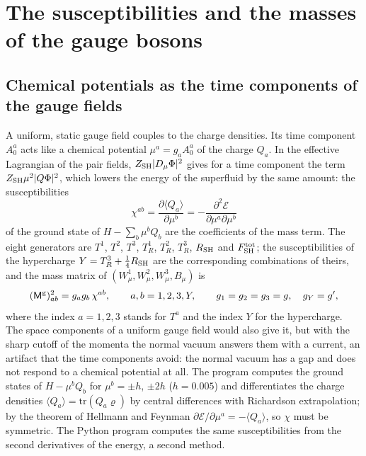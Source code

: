 \documentclass[aps,prd,onecolumn,superscriptaddress,nofootinbib,floatfix,longbibliography]{revtex4-2}
\newcommand{\SH}{{\rm SH}}
\newcommand{\tr}{\mathrm{tr}}
\begin{document}
\section{The susceptibilities and the masses of the gauge bosons}
\label{sec:gauge}

\subsection{Chemical potentials as the time components of the gauge fields}

A uniform, static gauge field couples to the charge densities. Its time component $A^a_0$ acts like a chemical potential
$\mu^a=g_aA^a_0$ of the charge $Q_a$. In the effective Lagrangian of the pair fields, $Z_\SH|D_\mu\Phi|^2$ gives for a
time component the term $Z_\SH\mu^2|Q\Phi|^2$, which lowers the energy of the superfluid by the same amount: the
susceptibilities
\begin{equation}
\chi^{ab}=\frac{\partial\langle Q_a\rangle}{\partial\mu^b}=-\frac{\partial^2\mathcal E}{\partial\mu^a\partial\mu^b}
\label{eq:chi}
\end{equation}
of the ground state of $H-\sum_b\mu^bQ_b$ are the coefficients of the mass term. The eight generators are $T^1$, $T^2$,
$T^3$, $T^1_R$, $T^2_R$, $T^3_R$, $R_\SH$ and $F^{\rm tot}_\SH$; the susceptibilities of the hypercharge
$Y=T^3_R+\tfrac14R_\SH$ are the corresponding combinations of theirs, and the mass matrix of $(W^1_\mu,W^2_\mu,W^3_\mu,B_\mu)$ is
\begin{equation}
(\mathsf M^{\rm g})^2_{ab}=g_ag_b\,\chi^{ab},\qquad a,b=1,2,3,Y,\qquad g_1=g_2=g_3=g,\quad g_Y=g',
\label{eq:Mg}
\end{equation}
where the index $a=1,2,3$ stands for $T^a$ and the index $Y$ for the hypercharge.
The space components of a uniform gauge field would also give it, but with the sharp cutoff of the momenta the normal
vacuum answers them with a current, an artifact that the time components avoid: the normal vacuum has a gap and does not
respond to a chemical potential at all. The program computes the ground states of $H-\mu^bQ_b$ for $\mu^b=\pm h$, $\pm2h$
($h=0.005$) and differentiates the charge densities $\langle Q_a\rangle=\tr(Q_a\varrho)$ by central differences with
Richardson extrapolation; by the theorem of Hellmann and Feynman $\partial\mathcal E/\partial\mu^a=-\langle Q_a\rangle$, so
$\chi$ must be symmetric. The Python program computes the same susceptibilities from the second derivatives of the
energy, a second method.
\end{document}
